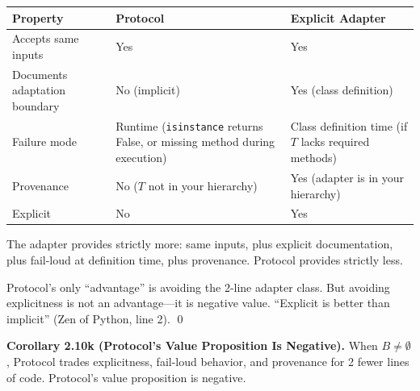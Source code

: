 \small
\begin{longtable}[]{@{}
  >{\raggedright\arraybackslash}p{}
  >{\raggedright\arraybackslash}p{}
  >{\raggedright\arraybackslash}p{}@{}}
\toprule\noalign{}
\begin{minipage}[b]{\linewidth}\raggedright
Property
\end{minipage} & \begin{minipage}[b]{\linewidth}\raggedright
Protocol
\end{minipage} & \begin{minipage}[b]{\linewidth}\raggedright
Explicit Adapter
\end{minipage} \\
\midrule\noalign{}
\endhead
\bottomrule\noalign{}
\endlastfoot
Accepts same inputs & Yes & Yes \\
Documents adaptation boundary & No (implicit) & Yes (class
definition) \\
Failure mode & Runtime (\texttt{isinstance} returns False, or missing
method during execution) & Class definition time (if \(T\) lacks
required methods) \\
Provenance & No (\(T\) not in your hierarchy) & Yes (adapter is in your
hierarchy) \\
Explicit & No & Yes \\
\end{longtable}

The adapter provides strictly more: same inputs, plus explicit
documentation, plus fail-loud at definition time, plus provenance.
Protocol provides strictly less.

Protocol's only ``advantage'' is avoiding the 2-line adapter class. But
avoiding explicitness is not an advantage---it is negative value.
``Explicit is better than implicit'' (Zen of Python, line 2).
\qed

\textbf{Corollary 2.10k (Protocol's Value Proposition Is Negative).}
When \(B \neq \emptyset\), Protocol trades explicitness, fail-loud
behavior, and provenance for 2 fewer lines of code. Protocol's value
proposition is negative.

